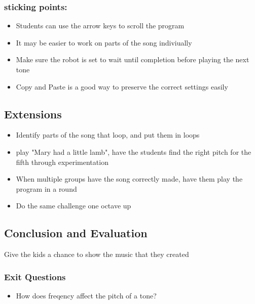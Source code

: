 \documentclass{lessonplan}
\begin{document}
      \subsubsection{sticking points:}
      \begin{itemize}
        \item Students can use the arrow keys to scroll the program
        \item It may be easier to work on parts of the song
          indiviually
        \item Make sure the robot is set to wait until completion
          before playing the next tone
        \item Copy and Paste is a good way to preserve the correct
          settings easily
      \end{itemize}
    \subsection{Extensions}
      \begin{itemize}
        \item Identify parts of the song that loop, and put them in
          loops
        \item play "Mary had a little lamb", have the students find
          the right pitch for the fifth through experimentation
        \item When multiple groups have the song correctly made, have
          them play the program in a round
        \item Do the same challenge one octave up
      \end{itemize}
    \subsection{Conclusion and Evaluation}
      Give the kids a chance to show the music that they created
      \subsubsection{Exit Questions}
      \begin{itemize}
        \item How does freqency affect the pitch of a tone?
      \end{itemize}
\end{document}
